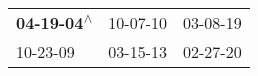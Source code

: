 \begin{supertabular}{lll}
 \textbf{04-19-04\textsuperscript{$\wedge$}} &  10-07-10\textsuperscript{} &  03-08-19\textsuperscript{} \\
                  10-23-09\textsuperscript{} &  03-15-13\textsuperscript{} &  02-27-20\textsuperscript{} \\
\end{supertabular}
